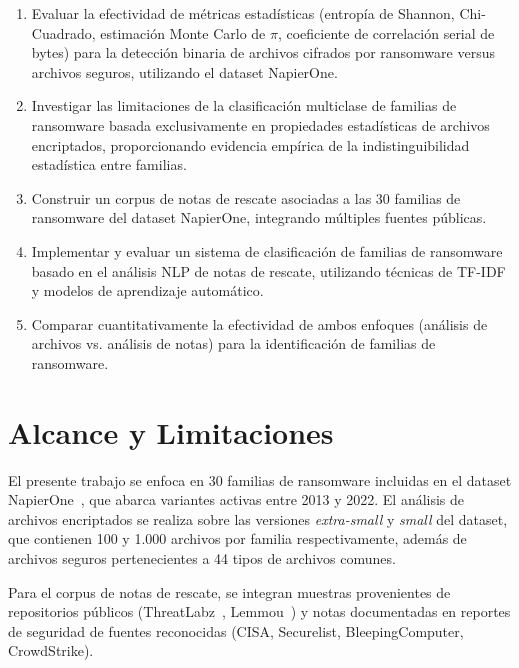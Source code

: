\begin{enumerate}
    \item Evaluar la efectividad de métricas estadísticas (entropía de Shannon, Chi-Cuadrado, estimación Monte Carlo de $\pi$, coeficiente de correlación serial de bytes) para la detección binaria de archivos cifrados por ransomware versus archivos seguros, utilizando el dataset NapierOne.

    \item Investigar las limitaciones de la clasificación multiclase de familias de ransomware basada exclusivamente en propiedades estadísticas de archivos encriptados, proporcionando evidencia empírica de la indistinguibilidad estadística entre familias.

    \item Construir un corpus de notas de rescate asociadas a las 30 familias de ransomware del dataset NapierOne, integrando múltiples fuentes públicas.

    \item Implementar y evaluar un sistema de clasificación de familias de ransomware basado en el análisis NLP de notas de rescate, utilizando técnicas de TF-IDF y modelos de aprendizaje automático.

    \item Comparar cuantitativamente la efectividad de ambos enfoques (análisis de archivos vs. análisis de notas) para la identificación de familias de ransomware.
\end{enumerate}

\section{Alcance y Limitaciones}

El presente trabajo se enfoca en 30 familias de ransomware incluidas en el dataset NapierOne~\cite{paper_7_napierone}, que abarca variantes activas entre 2013 y 2022. El análisis de archivos encriptados se realiza sobre las versiones \textit{extra-small} y \textit{small} del dataset, que contienen 100 y 1.000 archivos por familia respectivamente, además de archivos seguros pertenecientes a 44 tipos de archivos comunes.

Para el corpus de notas de rescate, se integran muestras provenientes de repositorios públicos (ThreatLabz~\cite{threatlabz}, Lemmou~\cite{paper_5_dataset}) y notas documentadas en reportes de seguridad de fuentes reconocidas (CISA, Securelist, BleepingComputer, CrowdStrike).

